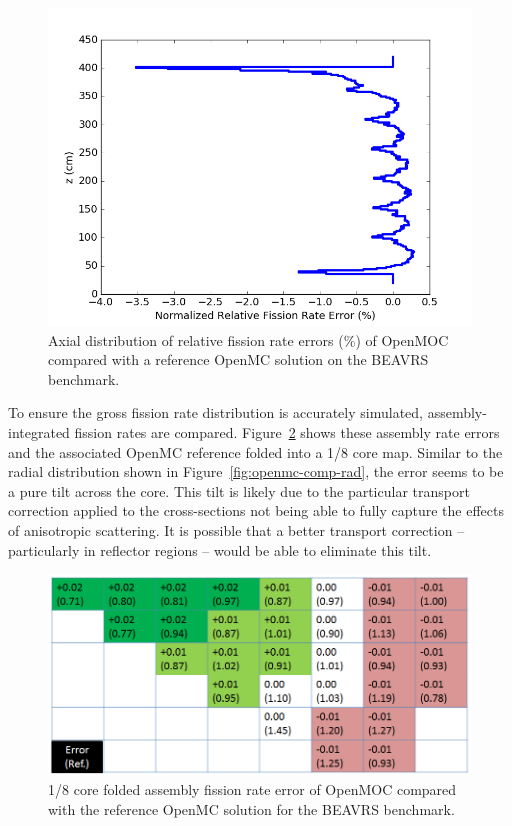 \documentclass[12pt,twoside]{mitthesis-exec}
\begin{document}
\begin{figure}[ht!]
	\centering
	\includegraphics[width=0.65\linewidth]{figures/results/full-core/axial_error_v_openmc.png}
	\caption{Axial distribution of relative fission rate errors (\%) of OpenMOC compared with a reference OpenMC solution on the BEAVRS benchmark.}
	\label{fig:openmc-comp-ax}
\end{figure}


To ensure the gross fission rate distribution is accurately simulated, assembly-integrated fission rates are compared. Figure~\ref{fig:assembly-rr} shows these assembly rate errors and the associated OpenMC reference folded into a 1/8 core map. Similar to the radial distribution shown in Figure~\ref{fig:openmc-comp-rad}, the error seems to be a pure tilt across the core. This tilt is likely due to the particular transport correction applied to the cross-sections not being able to fully capture the effects of anisotropic scattering. It is possible that a better transport correction -- particularly in reflector regions -- would be able to eliminate this tilt.

\begin{figure}[ht!]
	\centering
	\includegraphics[width=\linewidth]{figures/results/full-core/folded-1-8-core-assembly-rr.png}
	\caption{1/8 core folded assembly fission rate error of OpenMOC compared with the reference OpenMC solution for the BEAVRS benchmark.}
	\label{fig:assembly-rr}
\end{figure}
\end{document}
